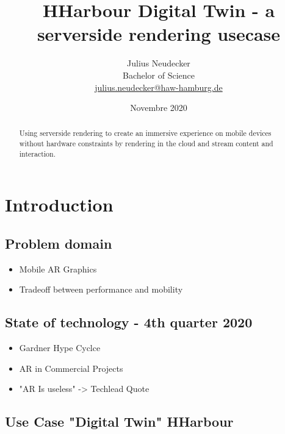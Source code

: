 \documentclass[titlepage, a4paper, 11pt]{scrartcl}
\begin{document}
    \title{HHarbour Digital Twin - a serverside rendering usecase}
    \author{Julius Neudecker \\ Bachelor of Science \\ \href{mailto:julius.neudecker@haw-hamburg.de}{julius.neudecker@haw-hamburg.de} }
    \date{Novembre 2020}

    \maketitle

    \tableofcontents

    \begin{abstract}
        Using serverside rendering to create an immersive experience on mobile devices without hardware constraints
        by rendering in the cloud and stream content and interaction.
    \end{abstract}

    \section{Introduction}

        \subsection{Problem domain}

            \begin{itemize}
                \item Mobile AR Graphics
                \item Tradeoff between performance and mobility
            \end{itemize}

        \subsection{State of technology - 4th quarter 2020}

            \begin{itemize}
                \item Gardner Hype Cyclce
                \item AR in Commercial Projects
                \item "AR Is useless" -> Techlead Quote
            \end{itemize}

        \subsection{Use Case "Digital Twin" HHarbour}
\end{document}
